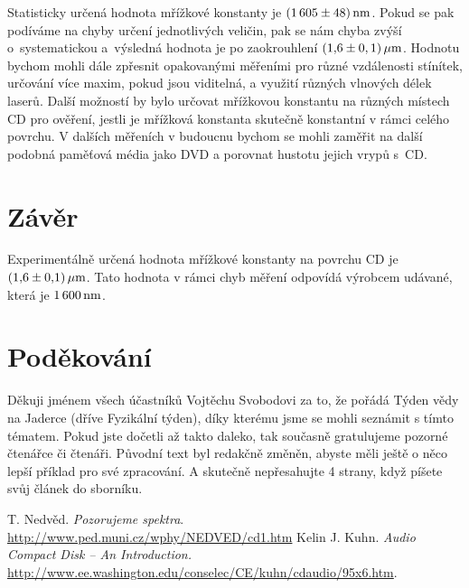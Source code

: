 \documentclass[12pt,a4paper]{article}
\begin{document}
Statisticky určená hodnota mřížkové konstanty je $\left(1\,605\pm 48\right){\rm nm}$. Pokud se pak po\-dí\-vá\-me na chyby určení jednotlivých veličin, pak se nám chyba zvýší o~systematickou a~výsledná hodnota je po zaokrouhlení $\left(1,\!6\pm 0,1\right){\rm \mu{}m}$. Hodnotu bychom mohli dále zpře\-s\-nit opakovanými měřeními pro různé vzdálenosti stínítek, určování více maxim, pokud jsou viditelná, a využití různých vlnových délek laserů. Další možností by bylo určovat mřížkovou konstantu na různých místech CD pro ověření, jestli je mřížková konstanta skutečně konstantní v rámci celého povrchu. V dalších měřeních v budoucnu bychom se mohli zaměřit na další podobná paměťová média jako DVD a porovnat hustotu jejich vrypů s~CD.


\section{Závěr}
Experimentálně určená hodnota mřížkové konstanty na povrchu CD je $\left(1,\!6\pm 0,\!1\right){\rm \mu{}m}$. Tato hodnota v rámci chyb měření odpovídá výrobcem udávané, která je $\rm 1\,600\,nm$.


\section*{Poděkování}
Děkuji jménem všech účastníků Vojtěchu Svobodovi za to, že pořádá Týden vědy na Jaderce (dříve Fyzikální týden), díky kterému jsme se mohli seznámit s tímto tématem. Pokud jste dočetli až takto daleko, tak současně gratulujeme pozorné čtenářce či čtenáři. Původní text byl redakčně změněn, abyste měli ještě o něco lepší příklad pro své zpracování. A skutečně nepřesahujte 4 strany, když píšete svůj článek do sborníku.

\begin{thebibliography}{99}
T. Nedvěd. {\it Pozorujeme spektra}. \href{http://www.ped.muni.cz/wphy/NEDVED/cd1.htm}{http://www.ped.muni.cz/wphy/NEDVED/cd1.htm}
Kelin J. Kuhn. {\it Audio Compact Disk -- An Introduction.} \href{http://www.ee.washington.edu/conselec/CE/kuhn/cdaudio/95x6.htm}{http://www.ee.washington.edu/conselec/CE/kuhn/cdaudio/95x6.htm}.
\end{thebibliography}
\end{document}
